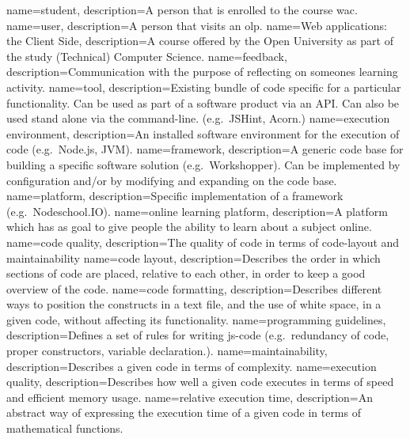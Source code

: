 {
  name=student,
  description={A person that is enrolled to the course \gls{wac}.}
}
{
  name=user,
  description={A person that visits an \gls{olp}.}
}
{
  name=Web applications: the Client Side,
  description={A course offered by the Open University
    as part of the study (Technical) Computer Science.}
}
{
  name=feedback,
  description={Communication with the purpose of
    reflecting on someones learning activity.}
}
{
  name=tool,
  description={Existing bundle of \gls{code}
    specific for a particular functionality.
    Can be used as part of a software product via an API.
    Can also be used stand alone via the command-line.
    (e.g.\ JSHint, Acorn.)}
}
{
  name=execution environment,
  description={An installed software environment
    for the execution of code (e.g.\ Node.js, JVM).}
}
{
  name=framework,
  description={A generic code base for building
    a specific software solution (e.g.\ Workshopper).
    Can be implemented by configuration and/or
    by modifying and expanding on the code base.}
}
{
  name=platform,
  description={Specific implementation of a \gls{framework}
    (e.g.\ Nodeschool.IO).}
}
{
  name=online learning platform,
  description={A \gls{platform} which has as goal
    to give people the ability to learn about a subject online.}
}
{
  name=code quality,
  description={The quality of code in terms of \gls{code-layout}
    and \gls{maintainability}}
}
{
  name=code layout,
  description={Describes the order in which sections of \gls{code} are placed,
    relative to each other,
    in order to keep a good overview of the \gls{code}.}
}
{
  name=code formatting,
  description={Describes different ways
    to position the \glspl{construct} in a text file,
    and the use of white space, in a given \gls{code},
    without affecting its functionality.}
}
{
  name=programming guidelines,
  description={Defines a set of rules for writing {js-code}
    (e.g.\ redundancy of code, proper constructors, variable declaration.).}
}
{
  name=maintainability,
  description={Describes a given \gls{code} in terms of complexity.}
}
{
  name=execution quality,
  description={Describes how well a given \gls{code} executes
    in terms of speed and efficient memory usage.}
}
{
  name=relative execution time,
  description={An abstract way of expressing the execution time
    of a given \gls{code} in terms of mathematical functions.}
}

